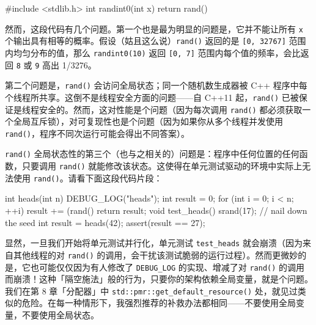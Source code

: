 \begin{codebox}[cpp]
     #include <stdlib.h>
     int randint0(int x) {
       return rand() %
     }
\end{codebox}

然而，这段代码有几个问题。第一个也是最为明显的问题是，它并不能让所有 \texttt{x} 个输出具有相等的概率。假设（姑且这么说）\texttt{rand(\allowbreak{})\allowbreak{}} 返回的是 \texttt{[0,\allowbreak{} 32767]} 范围内均匀分布的值，那么 \texttt{randint0(\allowbreak{}10)\allowbreak{}} 返回 \texttt{[0,\allowbreak{} 7]} 范围内每个值的频率，会比返回 \texttt{8} 或 \texttt{9} 高出 1/3276。

第二个问题是，\texttt{rand(\allowbreak{})\allowbreak{}} 会访问全局状态；同一个随机数生成器被 C++ 程序中每个线程所共享。这倒不是线程安全方面的问题——自 C++11 起，\texttt{rand(\allowbreak{})\allowbreak{}} 已被保证是线程安全的。然而，这对性能是个问题（因为每次调用 \texttt{rand(\allowbreak{})\allowbreak{}} 都必须获取一个全局互斥锁），对可复现性也是个问题（因为如果你从多个线程并发使用 \texttt{rand(\allowbreak{})\allowbreak{}}，程序不同次运行可能会得出不同答案）。

\texttt{rand(\allowbreak{})\allowbreak{}} 全局状态性的第三个（也与之相关的）问题是：程序中任何位置的任何函数，只要调用 \texttt{rand(\allowbreak{})\allowbreak{}} 就能修改该状态。这使得在单元测试驱动的环境中实际上无法使用 \texttt{rand(\allowbreak{})\allowbreak{}}。请看下面这段代码片段：

\begin{codebox}[cpp]
     int heads(int n) {
       DEBUG_LOG("heads");
       int result = 0;
       for (int i = 0; i < n; ++i) {
         result += (rand() %
       }
       return result;
     }
     void test_heads() {
       srand(17); // nail down the seed
       int result = heads(42);
       assert(result == 27);
     }
\end{codebox}

显然，一旦我们开始将单元测试并行化，单元测试 \texttt{test\_\allowbreak{}heads} 就会崩溃（因为来自其他线程的对 \texttt{rand(\allowbreak{})\allowbreak{}} 的调用，会干扰该测试脆弱的运行过程）。然而更微妙的是，它也可能仅仅因为有人修改了 \texttt{DEBUG\_\allowbreak{}LOG} 的实现、增减了对 \texttt{rand(\allowbreak{})\allowbreak{}} 的调用而崩溃！这种「隔空施法」般的行为，只要你的架构依赖全局变量，就是个问题。我们在第 8 章「分配器」中 \texttt{std::\allowbreak{}pmr::\allowbreak{}get\_\allowbreak{}default\_\allowbreak{}resource(\allowbreak{})\allowbreak{}} 处，就见过类似的危险。在每一种情形下，我强烈推荐的补救办法都相同——不要使用全局变量，不要使用全局状态。


